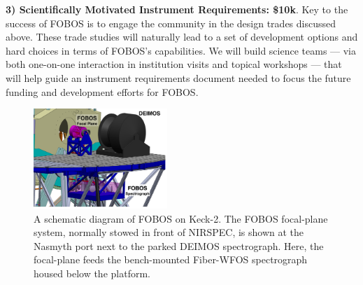 \documentclass[11pt,letterpaper]{article}
\begin{document}
{\bf 3) Scientifically Motivated Instrument Requirements: \$10k}.  Key
to the success of FOBOS is to engage the community in the design trades
discussed above.  These trade studies will naturally lead to a set of
development options and hard choices in terms of FOBOS's capabilities.
We will build science teams --- via both one-on-one interaction in
institution visits and topical workshops --- that will help guide an
instrument requirements document needed to focus the future funding and
development efforts for FOBOS.
\medskip

\begin{figure}\small
%
\includegraphics[width=0.45\textwidth]{./figs/FOBOSatKeck.pdf}
%
\caption{\label{fig:atkeck} A schematic diagram of FOBOS on Keck-2.  The
FOBOS focal-plane system, normally stowed in front of NIRSPEC, is shown
at the Nasmyth port next to the parked DEIMOS spectrograph.  Here, the
focal-plane feeds the bench-mounted Fiber-WFOS spectrograph housed below
the platform.}
\end{figure}
\end{document}
